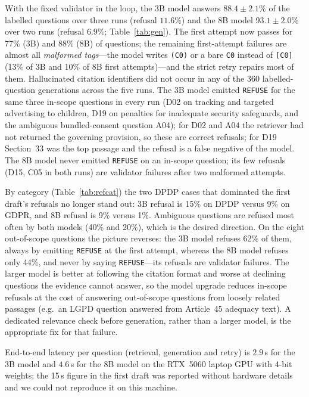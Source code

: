 With the fixed validator in the loop, the 3B model answers $88.4\pm2.1\%$ of the labelled questions over three runs (refusal $11.6\%$) and the 8B model $93.1\pm2.0\%$ over two runs (refusal $6.9\%$; Table~\ref{tab:gen}). The first attempt now passes for 77\% (3B) and 88\% (8B) of questions; the remaining first-attempt failures are almost all \emph{malformed tags}---the model writes \texttt{(C0)} or a bare \texttt{C0} instead of \texttt{[C0]} (13\% of 3B and 10\% of 8B first attempts)---and the strict retry repairs most of them. Hallucinated citation identifiers did not occur in any of the 360 labelled-question generations across the five runs. The 3B model emitted \texttt{REFUSE} for the same three in-scope questions in every run (D02 on tracking and targeted advertising to children, D19 on penalties for inadequate security safeguards, and the ambiguous bundled-consent question A04); for D02 and A04 the retriever had not returned the governing provision, so these are correct refusals; for D19 Section~33 was the top passage and the refusal is a false negative of the model. The 8B model never emitted \texttt{REFUSE} on an in-scope question; its few refusals (D15, C05 in both runs) are validator failures after two malformed attempts.

By category (Table~\ref{tab:refcat}) the two DPDP cases that dominated the first draft's refusals no longer stand out: 3B refusal is 15\% on DPDP versus 9\% on GDPR, and 8B refusal is 9\% versus 1\%. Ambiguous questions are refused most often by both models (40\% and 20\%), which is the desired direction. On the eight out-of-scope questions the picture reverses: the 3B model refuses 62\% of them, always by emitting \texttt{REFUSE} at the first attempt, whereas the 8B model refuses only 44\%, and never by saying \texttt{REFUSE}---its refusals are validator failures. The larger model is better at following the citation format and worse at declining questions the evidence cannot answer, so the model upgrade reduces in-scope refusals at the cost of answering out-of-scope questions from loosely related passages (e.g.\ an LGPD question answered from Article~45 adequacy text). A dedicated relevance check before generation, rather than a larger model, is the appropriate fix for that failure.

End-to-end latency per question (retrieval, generation and retry) is $2.9$\,s for the 3B model and $4.6$\,s for the 8B model on the RTX~5060 laptop GPU with 4-bit weights; the 15\,s figure in the first draft was reported without hardware details and we could not reproduce it on this machine.
